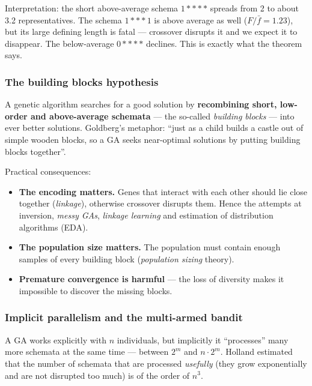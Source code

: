 \documentclass[11pt,a4paper]{article}
\theoremstyle{definition}
\providecommand{\uv}[1]{``#1''}
\begin{document}
Interpretation: the short above-average schema $1{*}{*}{*}{*}$ spreads from 2 to
about 3.2 representatives. The schema $1{*}{*}{*}1$ is above average as well
($F/\bar f = 1.23$), but its large defining length is fatal --- crossover
disrupts it and we expect it to disappear. The below-average
$0{*}{*}{*}{*}$ declines. This is exactly what the theorem says.

\subsubsection{The building blocks hypothesis}

\begin{defbox}
A genetic algorithm searches for a good solution by \textbf{recombining short,
low-order and above-average schemata} --- the so-called \emph{building blocks}
--- into ever better solutions.
Goldberg's metaphor: \uv{just as a child builds a castle out of simple wooden
blocks, so a GA seeks near-optimal solutions by putting building blocks
together}.
\end{defbox}

Practical consequences:
\begin{itemize}
\item \textbf{The encoding matters.} Genes that interact with each other should
  lie close together (\emph{linkage}), otherwise crossover disrupts them. Hence
  the attempts at inversion, \emph{messy GAs}, \emph{linkage learning} and
  estimation of distribution algorithms (EDA).
\item \textbf{The population size matters.} The population must contain enough
  samples of every building block (\emph{population sizing} theory).
\item \textbf{Premature convergence is harmful} --- the loss of diversity makes
  it impossible to discover the missing blocks.
\end{itemize}

\subsubsection{Implicit parallelism and the multi-armed bandit}

\begin{defbox}
A GA works explicitly with $n$ individuals, but implicitly it
\uv{processes} many more schemata at the same time --- between $2^m$ and
$n \cdot 2^m$. Holland estimated that the number of schemata that are processed
\emph{usefully} (they grow exponentially and are not disrupted too much) is of
the order of $n^3$.
\end{defbox}
\end{document}
